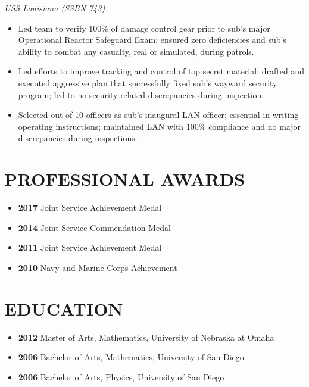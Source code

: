 \documentclass[10pt]{article}
\def\tightlist{}
\begin{document}
\emph{USS Louisiana (SSBN 743)}

\begin{itemize}
\tightlist
\item
  Led team to verify 100\% of damage control gear prior to sub's major
  Operational Reactor Safeguard Exam; ensured zero deficiencies and
  sub's ability to combat any casualty, real or simulated, during
  patrols.
\item
  Led efforts to improve tracking and control of top secret material;
  drafted and executed aggressive plan that successfully fixed sub's
  wayward security program; led to no security-related discrepancies
  during inspection.
\item
  Selected out of 10 officers as sub's inaugural LAN officer; essential
  in writing operating instructions; maintained LAN with 100\%
  compliance and no major discrepancies during inspections.
\end{itemize}

\hypertarget{professional-awards}{%
\section{PROFESSIONAL AWARDS}\label{professional-awards}}

\begin{itemize}
\tightlist
\item
  \textbf{2017} Joint Service Achievement Medal
\item
  \textbf{2014} Joint Service Commendation Medal
\item
  \textbf{2011} Joint Service Achievement Medal
\item
  \textbf{2010} Navy and Marine Corps Achievement
\end{itemize}

\hypertarget{education}{%
\section{EDUCATION}\label{education}}

\begin{itemize}
\tightlist
\item
  \textbf{2012} Master of Arts, Mathematics, University of Nebraska at
  Omaha
\item
  \textbf{2006} Bachelor of Arts, Mathematics, University of San Diego
\item
  \textbf{2006} Bachelor of Arts, Physics, University of San Diego
\end{itemize}
\end{document}
